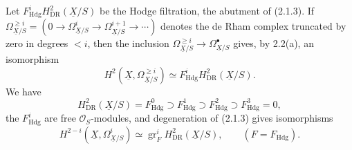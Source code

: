 \documentclass[10pt]{article}
\newcommand{\UX}{\underline{X}}
\begin{document}
Let $F^i_{\mathrm{Hdg}}H^2_{\mathrm{DR}}(\UX/S)$ be the Hodge filtration, the abutment of (2.1.3). If $\Omega^{\ge i}_{\UX/S}=(0\to\Omega^i_{\UX/S}\to\Omega^{i+1}_{\UX/S}\to\cdots)$ denotes the de Rham complex truncated by zero in degrees $<i$, then the inclusion $\Omega^{\ge i}_{\UX/S}\to\Omega^\bullet_{\UX/S}$ gives, by 2.2(a), an isomorphism
\begin{equation}\tag{2.3.4}
H^2(\UX,\Omega^{\ge i}_{\UX/S})\simeq F^i_{\mathrm{Hdg}}H^2_{\mathrm{DR}}(\UX/S).
\end{equation}
We have
\begin{equation}\tag{2.3.5}
H^2_{\mathrm{DR}}(\UX/S)=F^0_{\mathrm{Hdg}}\supset F^1_{\mathrm{Hdg}}
\supset F^2_{\mathrm{Hdg}}\supset F^3_{\mathrm{Hdg}}=0,
\end{equation}
the $F^i_{\mathrm{Hdg}}$ are free $\mathcal O_S$-modules, and degeneration of (2.1.3) gives isomorphisms
\begin{equation}\tag{2.3.6}
H^{2-i}(\UX,\Omega^i_{\UX/S})\simeq\operatorname{gr}^i_F H^2_{\mathrm{DR}}(\UX/S),
\qquad(F=F_{\mathrm{Hdg}}).
\end{equation}
\newpage
\setcounter{footnote}{0}
\fontsize{10.2pt}{12.04pt}\selectfont
\end{document}
